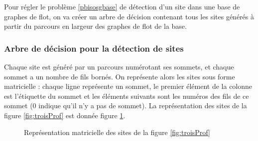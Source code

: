 Pour régler le problème \ref{pbisosgbase} de détection d'un site dans une base de graphes de flot, on va créer un arbre de décision contenant tous les sites générés à partir du parcours en largeur des graphes de flot de la base.

\subsubsection{Arbre de décision pour la détection de sites}
Chaque site est généré par un parcours numérotant ses sommets, et chaque sommet a un nombre de fils bornés. On représente alors les sites sous forme matricielle : chaque ligne représente un sommet, le premier élément de la colonne est l'étiquette du sommet et les éléments suivants sont les numéros des fils de ce sommet (0 indique qu'il n'y a pas de sommet). La représentation des sites de la figure \ref{fig:troisProf} est donnée figure \ref{fig:troisProfMatRed}.

\begin{figure}[h]
\begin{center}
\end{center}
\caption{Représentation matricielle des sites de la figure \ref{fig:troisProf}}
\label{fig:troisProfMatRed}
\end{figure}

